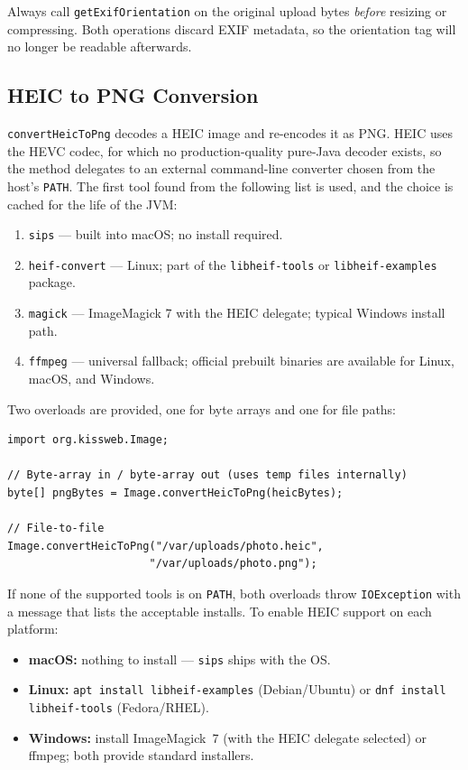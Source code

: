 \begin{tipbox}
Always call \texttt{getExifOrientation} on the original upload bytes \emph{before} resizing or compressing.  Both operations discard EXIF metadata, so the orientation tag will no longer be readable afterwards.
\end{tipbox}

\subsection{HEIC to PNG Conversion}
\label{sec:util-image-heic}

\texttt{convertHeicToPng} decodes a HEIC image and re-encodes it as PNG.  HEIC uses the HEVC codec, for which no production-quality pure-Java decoder exists, so the method delegates to an external command-line converter chosen from the host's \texttt{PATH}.  The first tool found from the following list is used, and the choice is cached for the life of the JVM:

\begin{enumerate}
\item \texttt{sips} --- built into macOS; no install required.
\item \texttt{heif-convert} --- Linux; part of the \texttt{libheif-tools} or \texttt{libheif-examples} package.
\item \texttt{magick} --- ImageMagick 7 with the HEIC delegate; typical Windows install path.
\item \texttt{ffmpeg} --- universal fallback; official prebuilt binaries are available for Linux, macOS, and Windows.
\end{enumerate}

Two overloads are provided, one for byte arrays and one for file paths:

\begin{lstlisting}[style=java]
import org.kissweb.Image;

// Byte-array in / byte-array out (uses temp files internally)
byte[] pngBytes = Image.convertHeicToPng(heicBytes);

// File-to-file
Image.convertHeicToPng("/var/uploads/photo.heic",
                      "/var/uploads/photo.png");
\end{lstlisting}

\begin{notebox}
If none of the supported tools is on \texttt{PATH}, both overloads throw \texttt{IOException} with a message that lists the acceptable installs.  To enable HEIC support on each platform:

\begin{itemize}
\item \textbf{macOS:} nothing to install --- \texttt{sips} ships with the OS.
\item \textbf{Linux:} \texttt{apt install libheif-examples} (Debian/Ubuntu) or \texttt{dnf install libheif-tools} (Fedora/RHEL).
\item \textbf{Windows:} install ImageMagick~7 (with the HEIC delegate selected) or ffmpeg; both provide standard installers.
\end{itemize}
\end{notebox}

